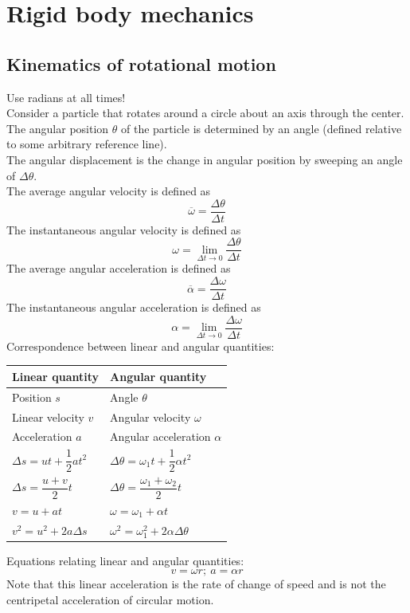 \section{Rigid body mechanics}
\subsection{Kinematics of rotational motion}
Use radians at all times!\\
Consider a particle that rotates around a circle about an axis through the center. The angular position $\theta$ of
the particle is determined by an angle (defined relative to some arbitrary reference line).\\
The angular displacement is the change in angular position by sweeping an angle of $\Delta\theta$.\\
The average angular velocity is defined as
\[\overline{\omega}=\dfrac{\Delta \theta}{\Delta t}\]
The instantaneous angular velocity is defined as
\[\omega=\lim_{\Delta t\to 0}\dfrac{\Delta \theta}{\Delta t}\]
The average angular acceleration is defined as
\[\overline{\alpha}=\dfrac{\Delta\omega}{\Delta t}\]
The instantaneous angular acceleration is defined as
\[\alpha=\lim_{\Delta t\to 0}\dfrac{\Delta\omega}{\Delta t}\]
Correspondence between linear and angular quantities:
\begin{center}
  \renewcommand{\arraystretch}{1.6}
  \begin{tabularx}{\textwidth}{@{}|Y |Y |@{}}
    \toprule
    Linear quantity & Angular quantity \\
    \midrule
    Position $s$ & Angle $\theta$ \\\hline
    Linear velocity $v$ & Angular velocity $\omega$ \\\hline
    Acceleration $a$ & Angular acceleration $\alpha$ \\\hline
    $\Delta s=ut+\dfrac{1}{2}at^2$ & $\Delta \theta=\omega_1t+\dfrac{1}{2}\alpha t^2$\\\hline
    $\Delta s=\dfrac{u+v}{2}t$ & $\Delta \theta=\dfrac{\omega_1+\omega_2}{2}t$\\\hline
    $v=u+at$ & $\omega=\omega_1+\alpha t$\\\hline
    $v^2=u^2+2a\Delta s$ & $\omega^2=\omega_1^2+2\alpha\Delta\theta$\\
    \bottomrule
  \end{tabularx}
\end{center}
Equations relating linear and angular quantities:
\[v=\omega r;\ a=\alpha r\]
Note that this linear acceleration is the rate of change of speed and is not the centripetal acceleration of circular motion.
